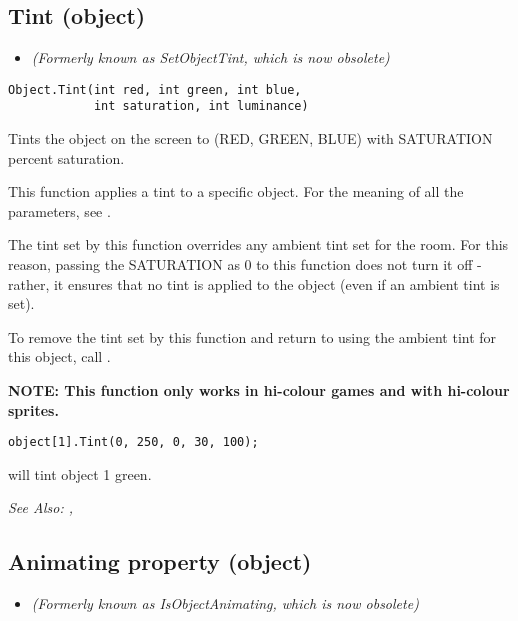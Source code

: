 \subsection{Tint (object)}\label{Object.Tint}%

\begin{itemize}
\item \it{(Formerly known as SetObjectTint, which is now obsolete)}
\end{itemize}

\begin{verbatim}
Object.Tint(int red, int green, int blue,
            int saturation, int luminance)
\end{verbatim}

Tints the object on the screen to (RED, GREEN, BLUE) with SATURATION percent
saturation.

This function applies a tint to a specific object. For the meaning of all the parameters,
see .

The tint set by this function overrides any ambient tint set for the room. For this
reason, passing the SATURATION as 0 to this function does not turn it off - rather, it
ensures that no tint is applied to the object (even if an ambient tint is set).

To remove the tint set by this function and return to using the ambient tint for this
object, call .

\bf{NOTE:} This function only works in hi-colour games and with hi-colour sprites.

\begin{verbatim}
object[1].Tint(0, 250, 0, 30, 100);
\end{verbatim}
will tint object 1 green.

\it{See Also:} ,



\subsection{Animating property (object)}\label{Object.Animating}%

\begin{itemize}
\item \it{(Formerly known as IsObjectAnimating, which is now obsolete)}
\end{itemize}

